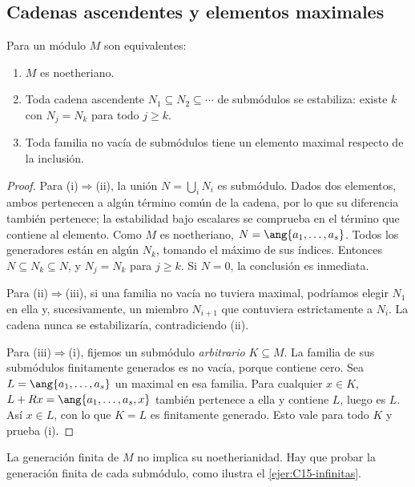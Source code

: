 \subsection{Cadenas ascendentes y elementos maximales}\label{tema:15-1-3}
\begin{prop}\label{prop:C15-cadenas}
Para un módulo $M$ son equivalentes:
\begin{enumerate}[label=\textup{(\roman*)}]
\item $M$ es noetheriano.
\item Toda cadena ascendente $N_1\subseteq N_2\subseteq\cdots$ de submódulos se estabiliza: existe $k$ con $N_j=N_k$ para todo $j\geq k$.
\item Toda familia no vacía de submódulos tiene un elemento maximal respecto de la inclusión.
\end{enumerate}
\end{prop}
\begin{proof}
Para (i)$\Rightarrow$(ii), la unión $N=\bigcup_i N_i$ es submódulo. Dados dos elementos, ambos pertenecen a algún término común de la cadena, por lo que su diferencia también pertenece; la estabilidad bajo escalares se comprueba en el término que contiene al elemento. Como $M$ es noetheriano, $N=\ang{a_1,\ldots,a_s}$. Todos los generadores están en algún $N_k$, tomando el máximo de sus índices. Entonces $N\subseteq N_k\subseteq N$, y $N_j=N_k$ para $j\geq k$. Si $N=0$, la conclusión es inmediata.

Para (ii)$\Rightarrow$(iii), si una familia no vacía no tuviera maximal, podríamos elegir $N_1$ en ella y, sucesivamente, un miembro $N_{i+1}$ que contuviera estrictamente a $N_i$. La cadena nunca se estabilizaría, contradiciendo (ii).

Para (iii)$\Rightarrow$(i), fijemos un submódulo \emph{arbitrario} $K\subseteq M$. La familia de sus submódulos finitamente generados es no vacía, porque contiene cero. Sea $L=\ang{a_1,\ldots,a_s}$ un maximal en esa familia. Para cualquier $x\in K$, $L+Rx=\ang{a_1,\ldots,a_s,x}$ también pertenece a ella y contiene $L$, luego es $L$. Así $x\in L$, con lo que $K=L$ es finitamente generado. Esto vale para todo $K$ y prueba (i).
\end{proof}
\begin{obs}
La generación finita de $M$ no implica su noetherianidad. Hay que probar la generación finita de cada submódulo, como ilustra el \cref{ejer:C15-infinitas}.
\end{obs}
